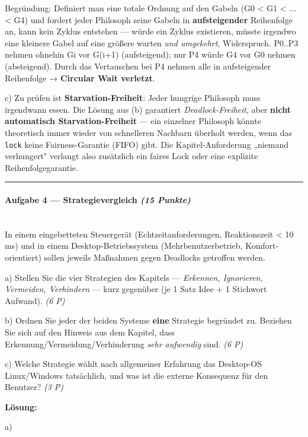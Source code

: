 \documentclass[11pt, a4paper]{article}
\begin{document}
Begründung: Definiert man eine totale Ordnung auf den Gabeln (G0 < G1 < ... < G4) und fordert jeder Philosoph seine Gabeln in \textbf{aufsteigender} Reihenfolge an, kann kein Zyklus entstehen — würde ein Zyklus existieren, müsste irgendwo eine kleinere Gabel auf eine größere warten \textit{und umgekehrt}, Widerspruch. P0..P3 nehmen ohnehin Gi vor G(i+1) (aufsteigend); nur P4 würde G4 vor G0 nehmen (absteigend). Durch das Vertauschen bei P4 nehmen alle in aufsteigender Reihenfolge → \textbf{Circular Wait verletzt}.


c) Zu prüfen ist \textbf{Starvation-Freiheit}: Jeder hungrige Philosoph muss irgendwann essen. Die Lösung aus (b) garantiert \textit{Deadlock-Freiheit}, aber \textbf{nicht automatisch Starvation-Freiheit} — ein einzelner Philosoph könnte theoretisch immer wieder von schnelleren Nachbarn überholt werden, wenn das \texttt{lock} keine Fairness-Garantie (FIFO) gibt. Die Kapitel-Anforderung „niemand verhungert" verlangt also zusätzlich ein faires Lock oder eine explizite Reihenfolgegarantie.



\noindent\textcolor{rulegray}{\rule{\linewidth}{0.4pt}}


\paragraph{Aufgabe 4 — Strategievergleich \textit{(15 Punkte)}}\mbox{}\\[2pt]

In einem eingebetteten Steuergerät (Echtzeitanforderungen, Reaktionszeit < 10 ms) und in einem Desktop-Betriebssystem (Mehrbenutzerbetrieb, Komfort-orientiert) sollen jeweils Maßnahmen gegen Deadlocks getroffen werden.


a) Stellen Sie die vier Strategien des Kapitels — \textit{Erkennen, Ignorieren, Vermeiden, Verhindern} — kurz gegenüber (je 1 Satz Idee + 1 Stichwort Aufwand). \textit{(6 P)}


b) Ordnen Sie jeder der beiden Systeme \textbf{eine} Strategie begründet zu. Beziehen Sie sich auf den Hinweis aus dem Kapitel, dass Erkennung/Vermeidung/Verhinderung \textit{sehr aufwendig} sind. \textit{(6 P)}


c) Welche Strategie wählt nach allgemeiner Erfahrung das Desktop-OS Linux/Windows tatsächlich, und was ist die externe Konsequenz für den Benutzer? \textit{(3 P)}


\textbf{Lösung:}


a)
\end{document}
